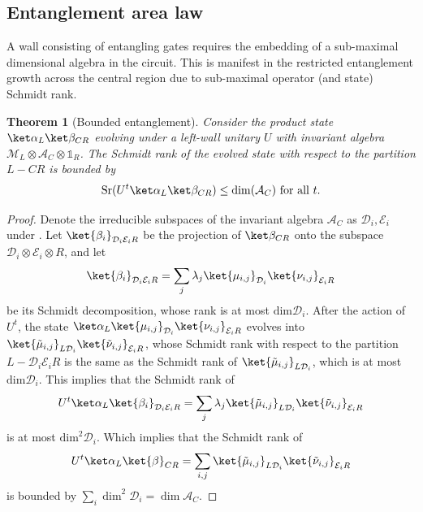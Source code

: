 \documentclass[11pt, twocolumn, floatfix, superscriptaddress, aps, prb, raggedbottom]{revtex4-2}
\newtheorem{theorem}{Theorem}[section]
\newcommand{\Id}{\mathds{1}}
\begin{document}
\subsection{Entanglement area law \label{sec:entanglement}}

A wall consisting of entangling gates requires the embedding of a sub-maximal dimensional algebra in the circuit. This is manifest in the restricted entanglement growth across the central region due to sub-maximal operator (and state) Schmidt rank. 

\begin{theorem}[Bounded entanglement]
Consider the product state $\ket\alpha_L \ket\beta_{CR}$ evolving under a left-wall unitary $U$ with invariant algebra $\mathcal{M}_L \otimes \mathcal{A}_C \otimes \Id_R$. The Schmidt rank of the evolved state with respect to the partition $L-CR$ is bounded by
\begin{align}\label{sr Fab}
  \mathrm{Sr}(U^t \ket\alpha_L \ket\beta_{CR})  
  \leq \mathrm{dim}(\mathcal A_C) \text{ for all } t.
\end{align}
\label{thm:schmidt_rank_bound}
\end{theorem}

\begin{proof}
Denote the irreducible subspaces of the invariant algebra $\mathcal{A}_C$ as $\mathcal{D}_i, \mathcal{E}_i$ under .
Let $\ket{\beta_i}_{\mathcal D_i \mathcal E_i R}$ be the projection of $\ket\beta_{CR}$ onto the subspace $\mathcal D_i \otimes \mathcal E_i \otimes R$, and let 
\begin{align}
  \ket{\beta_i}_{\mathcal D_i \mathcal E_i R} = \sum_j \lambda_j \ket{\mu_{i,j}}_{\mathcal D_i} \ket{\nu_{i,j}}_{\mathcal E_i R}        
\end{align}
be its Schmidt decomposition, whose rank is at most $\mathrm{dim}\mathcal D_i$. 
After the action of $U^t$, the state $\ket\alpha_L \ket{\mu_{i,j}}_{\mathcal D_i} \ket{\nu_{i,j}}_{\mathcal E_i R}$ evolves into $\ket{\tilde \mu_{i,j}}_{L\mathcal D_i} \ket{\tilde\nu_{i,j}}_{\mathcal E_i R}$, whose Schmidt rank with respect to the partition $L-\mathcal D_i \mathcal E_i R$ is the same as the Schmidt rank of $\ket{\tilde \mu_{i,j}}_{L\mathcal D_i}$, which is at most $\mathrm{dim}\mathcal D_i$. This implies that the Schmidt rank of 
\begin{align}
  U^t \ket\alpha_L \ket{\beta_i}_{\mathcal D_i \mathcal E_i R}
  = \sum_j \lambda_j \ket{\tilde \mu_{i,j}}_{L \mathcal D_i} \ket{\tilde \nu_{i,j}}_{\mathcal E_i R}
\end{align}
is at most $\mathrm{dim}^2\mathcal D_i$. Which implies that the Schmidt rank of 
\begin{align}
  U^t \ket\alpha_L \ket{\beta}_{CR}
  = \sum_{i,j} \ket{\tilde \mu_{i,j}}_{L \mathcal D_i} \ket{\tilde \nu_{i,j}}_{\mathcal E_i R}
\end{align}
is bounded by $\sum_i \dim^2 \mathcal{D}_i = \dim \mathcal{A}_C$.
\end{proof}
\end{document}
